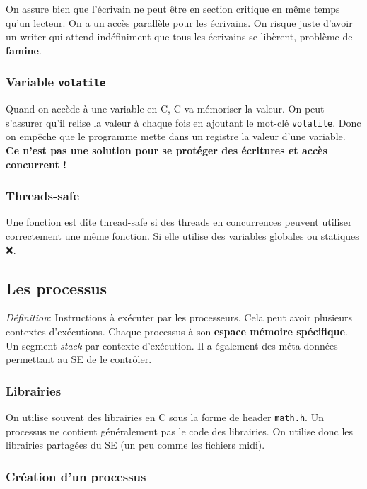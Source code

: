 On assure bien que l'écrivain ne peut être en section critique en même
temps qu'un lecteur. On a un accès parallèle pour les écrivains. On
risque juste d'avoir un writer qui attend indéfiniment que tous les
écrivains se libèrent, problème de \textbf{famine}.

\subsubsection{\texorpdfstring{Variable
\texttt{volatile}}{Variable volatile}}\label{variable-volatile}

Quand on accède à une variable en C, C va mémoriser la valeur. On peut
s'assurer qu'il relise la valeur à chaque fois en ajoutant le mot-clé
\texttt{volatile}. Donc on empêche que le programme mette dans un
registre la valeur d'une variable. \textbf{Ce n'est pas une solution
pour se protéger des écritures et accès concurrent !}

\subsubsection{Threads-safe}\label{threads-safe}

Une fonction est dite thread-safe si des threads en concurrences peuvent
utiliser correctement une même fonction. Si elle utilise des variables
globales ou statiques ❌.

\subsection{Les processus}\label{les-processus}

\emph{Définition}: Instructions à exécuter par les processeurs. Cela
peut avoir plusieurs contextes d'exécutions. Chaque processus à son
\textbf{espace mémoire spécifique}. Un segment \emph{stack} par contexte
d'exécution. Il a également des méta-données permettant au SE de le
contrôler.

\subsubsection{Librairies}\label{librairies}

On utilise souvent des librairies en C sous la forme de header
\texttt{math.h}. Un processus ne contient généralement pas le code des
librairies. On utilise donc les librairies partagées du SE (un peu comme
les fichiers midi).

\subsubsection{Création d'un processus}\label{cruxe9ation-dun-processus}

